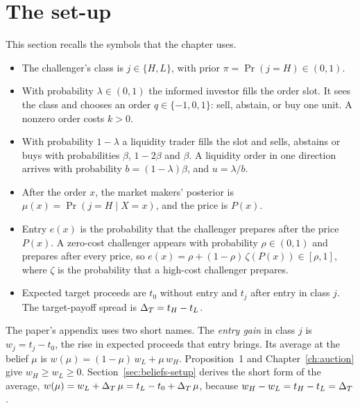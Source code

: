\section{The set-up}\label{sec:trading-setup}

This section recalls the symbols that the chapter uses.
\begin{itemize}
\item The challenger's class is \(j\in\{H,L\}\), with prior \(\pi=\Pr(j=H)\in(0,1)\).
\item With probability \(\lambda\in(0,1)\) the informed investor fills the order slot. It sees the class and
chooses an order \(q\in\{-1,0,1\}\): sell, abstain, or buy one unit. A nonzero order costs \(k>0\).
\item With probability \(1-\lambda\) a liquidity trader fills the slot and sells, abstains or buys with
probabilities \(\beta\), \(1-2\beta\) and \(\beta\). A liquidity order in one direction arrives with probability
\(b=(1-\lambda)\beta\), and \(u=\lambda/b\).
\item After the order \(x\), the market makers' posterior is \(\mu(x)=\Pr(j=H\mid X=x)\), and the price is \(P(x)\).
\item Entry \(e(x)\) is the probability that the challenger prepares after the price \(P(x)\). A zero-cost
challenger appears with probability \(\rho\in(0,1)\) and prepares after every price, so
\(e(x)=\rho+(1-\rho)\,\zeta(P(x))\in[\rho,1]\), where \(\zeta\) is the probability that a high-cost challenger
prepares.
\item Expected target proceeds are \(t_0\) without entry and \(t_j\) after entry in class \(j\). The target-payoff
spread is \(\Delta_T=t_H-t_L\).
\end{itemize}

The paper's appendix uses two short names. The \emph{entry gain} in class \(j\) is \(w_j=t_j-t_0\), the rise in
expected proceeds that entry brings. Its average at the belief \(\mu\) is \(w(\mu)=(1-\mu)\,w_L+\mu\,w_H\).
Proposition~1 and Chapter~\ref{ch:auction} give \(w_H\ge w_L\ge0\). Section~\ref{sec:beliefs-setup} derives the short form of the average, \(w(\mu)=w_L+\Delta_T\,\mu=t_L-t_0+\Delta_T\,\mu\), because \(w_H-w_L=t_H-t_L=\Delta_T\).

